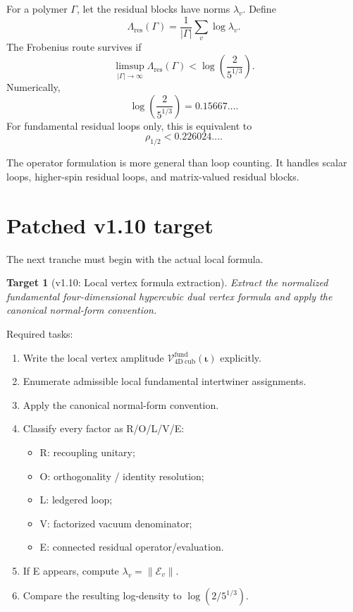 \documentclass[11pt]{article}
\newtheorem{target}{Target}
\begin{document}
For a polymer $\Gamma$, let the residual blocks have norms $\lambda_v$. Define
\[
  \Lambda_{\mathrm{res}}(\Gamma)=\frac{1}{|\Gamma|}\sum_{v}\log\lambda_v.
\]
The Frobenius route survives if
\[
  \limsup_{|\Gamma|\to\infty}\Lambda_{\mathrm{res}}(\Gamma)<\log\left(\frac{2}{5^{1/3}}\right).
\]
Numerically,
\[
  \log\left(\frac{2}{5^{1/3}}\right)=0.15667\ldots.
\]
For fundamental residual loops only, this is equivalent to
\[
  \rho_{1/2}<0.226024\ldots.
\]

The operator formulation is more general than loop counting. It handles scalar loops, higher-spin residual loops, and matrix-valued residual blocks.

\section{Patched v1.10 target}

The next tranche must begin with the actual local formula.

\begin{target}[v1.10: Local vertex formula extraction]
Extract the normalized fundamental four-dimensional hypercubic dual vertex formula and apply the canonical normal-form convention.
\end{target}

Required tasks:
\begin{enumerate}[leftmargin=1.25cm]
  \item Write the local vertex amplitude $\mathcal V_{\mathrm{4D\ cub}}^{\mathrm{fund}}(\boldsymbol\iota)$ explicitly.
  \item Enumerate admissible local fundamental intertwiner assignments.
  \item Apply the canonical normal-form convention.
  \item Classify every factor as R/O/L/V/E:
  \begin{itemize}
    \item R: recoupling unitary;
    \item O: orthogonality / identity resolution;
    \item L: ledgered loop;
    \item V: factorized vacuum denominator;
    \item E: connected residual operator/evaluation.
  \end{itemize}
  \item If E appears, compute $\lambda_v=\|\mathcal E_v\|$.
  \item Compare the resulting log-density to $\log(2/5^{1/3})$.
\end{enumerate}
\end{document}
